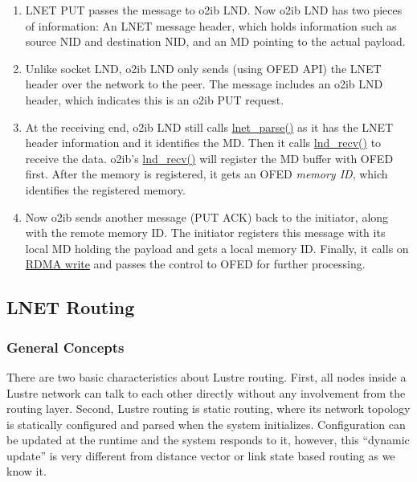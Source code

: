 \begin{enumerate}

\item LNET PUT passes the message to o2ib LND. Now o2ib LND has two pieces of
information: An LNET message header, which holds information such as source NID and
destination NID, and an MD pointing to the actual payload.

\item Unlike socket LND, o2ib LND only sends (using OFED API) the LNET header
over the network to the peer. The message includes an o2ib LND header, which
indicates this is an o2ib PUT request. 

\item At the receiving end, o2ib LND still calls \url{lnet_parse()} as it has
the LNET header information and it identifies the MD. Then it calls
\url{lnd_recv()} to receive the data. o2ib's \url{lnd_recv()} will register
the MD buffer with OFED first. After the memory is registered, it gets an OFED
\textit{memory ID}, which identifies the registered memory.

\item Now o2ib sends another message (PUT ACK) back to the initiator, along
with the remote memory ID. The initiator registers this message with its
local MD holding the payload and gets a local memory ID. Finally, it calls on
\url{RDMA write} and passes the control to OFED for further processing.

\end{enumerate}

\subsection{LNET Routing}

\subsubsection*{General Concepts}

There are two basic characteristics about Lustre routing. First, all nodes
inside a Lustre network can talk to each other directly without any involvement
from the routing layer. Second, Lustre routing is static routing, where its
network topology is statically configured and parsed when the system
initializes.  Configuration can be updated at the runtime and the system
responds to it, however, this ``dynamic update'' is very different from
distance vector or link state based routing as we know it. 


